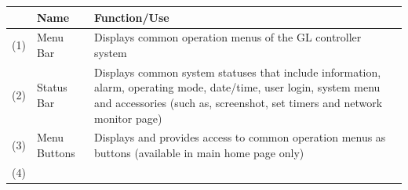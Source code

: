 \begin{longtable}[]{@{}lll@{}}
\toprule
\begin{minipage}[b]{0.06\columnwidth}\raggedright
\strut
\end{minipage} & \begin{minipage}[b]{0.23\columnwidth}\raggedright
Name\strut
\end{minipage} & \begin{minipage}[b]{0.62\columnwidth}\raggedright
Function/Use\strut
\end{minipage}\tabularnewline
\midrule
\endhead
\begin{minipage}[t]{0.06\columnwidth}\raggedright
(1)\strut
\end{minipage} & \begin{minipage}[t]{0.23\columnwidth}\raggedright
Menu Bar\strut
\end{minipage} & \begin{minipage}[t]{0.62\columnwidth}\raggedright
Displays common operation menus of the GL controller system\strut
\end{minipage}\tabularnewline
\begin{minipage}[t]{0.06\columnwidth}\raggedright
(2)\strut
\end{minipage} & \begin{minipage}[t]{0.23\columnwidth}\raggedright
Status Bar\strut
\end{minipage} & \begin{minipage}[t]{0.62\columnwidth}\raggedright
Displays common system statuses that include information, alarm,
operating mode, date/time, user login, system menu and accessories (such
as, screenshot, set timers and network monitor page)\strut
\end{minipage}\tabularnewline
\begin{minipage}[t]{0.06\columnwidth}\raggedright
(3)\strut
\end{minipage} & \begin{minipage}[t]{0.23\columnwidth}\raggedright
Menu Buttons\strut
\end{minipage} & \begin{minipage}[t]{0.62\columnwidth}\raggedright
Displays and provides access to common operation menus as buttons
(available in main home page only)\strut
\end{minipage}\tabularnewline
\begin{minipage}[t]{0.06\columnwidth}\raggedright
(4)\strut
\end{minipage} & \begin{minipage}[t]{0.23\columnwidth}\raggedright

\end{minipage}
\end{longtable}

